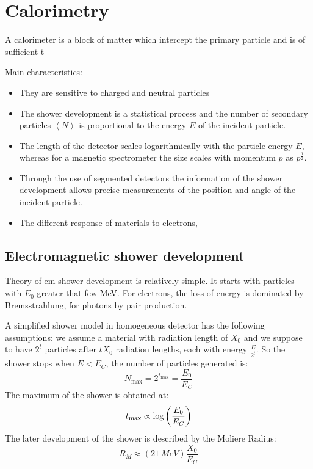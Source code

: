 \documentclass[../../main/main.tex]{subfiles}
\begin{document}
\section{Calorimetry}

A calorimeter is a block of matter which intercept the primary particle and is of sufficient t

Main characteristics:
\begin{itemize}
	\item They are sensitive to charged and neutral particles
	\item The shower development is a statistical process and the number of secondary particles \( \left\langle N \right\rangle \) is proportional to the energy \( E \) of the incident particle.
	\item The length of the detector scales logarithmically with the particle energy \( E \), whereas for a magnetic spectrometer the size scales with momentum \( p \) as \( p^{\frac{1}{2}} \).
	\item Through the use of segmented detectors the information of the shower development allows precise measurements of the position and angle of the incident particle.
	\item The different response of materials to electrons,

\end{itemize}

\subsection{Electromagnetic shower development}
Theory of em shower development is relatively simple. It starts with particles with \( E_0 \) greater that few MeV. For electrons, the loss of energy is dominated by Bremsstrahlung, for photons by pair production.

A simplified shower model in homogeneous detector has the following assumptions: we assume a material with radiation length of \( X_0 \) and we suppose to have \( 2^t \) particles after \( t X_0 \) radiation lengths, each with energy \( \frac{E}{2^t} \). So the shower stops when \( E < E_C \), the number of particles generated is:
\begin{equation}
	N_\mathrm{max}
	=
	2^{t_\mathrm{max}}
	=
	\frac{E_0}{E_C}
	\label{eq:}
\end{equation}
The maximum of the shower is obtained at:
\begin{equation}
	t_\mathrm{max}
	\propto
	\log \qty(\frac{E_0}{E_C})
	\label{eq:}
\end{equation}
The later development of the shower is described by the Moliere Radius:
\begin{equation}
	R_M
	\approx
	(21 \ \si{MeV}) \frac{X_0}{E_C}
	\label{eq:}
\end{equation}
\end{document}
